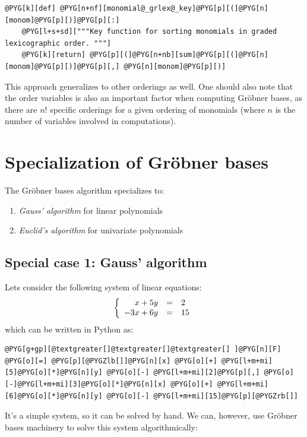 \begin{Verbatim}[commandchars=@\[\]]
@PYG[k][def] @PYG[n+nf][monomial@_grlex@_key]@PYG[p][(]@PYG[n][monom]@PYG[p][)]@PYG[p][:]
    @PYG[l+s+sd]["""Key function for sorting monomials in graded lexicographic order. """]
    @PYG[k][return] @PYG[p][(]@PYG[n+nb][sum]@PYG[p][(]@PYG[n][monom]@PYG[p][)]@PYG[p][,] @PYG[n][monom]@PYG[p][)]
\end{Verbatim}
\noindent
This approach generalizes to other orderings as well. One should also note that the order variables is
also an important factor when computing Gröbner bases, as there are $n!$ specific orderings for a
given ordering of monomials (where $n$ is the number of variables involved in computations).


\section{Specialization of Gröbner bases}

The Gröbner bases algorithm specializes to:
\begin{enumerate}
\item {} 
\emph{Gauss' algorithm} for linear polynomials

\item {} 
\emph{Euclid's algorithm} for univariate polynomials

\end{enumerate}


\subsection{Special case 1: Gauss' algorithm}

Lets consider the following system of linear equations:
\begin{gather}
\begin{split}\left\{
\begin{array}{rcl}
   x + 5 y &=& 2    \\
-3 x + 6 y &=& 15
\end{array}
\right.\end{split}\notag
\end{gather}
which can be written in Python as:

\begin{Verbatim}[commandchars=@\[\]]
@PYG[g+gp][@textgreater[]@textgreater[]@textgreater[] ]@PYG[n][F] @PYG[o][=] @PYG[p][@PYGZlb[]]@PYG[n][x] @PYG[o][+] @PYG[l+m+mi][5]@PYG[o][*]@PYG[n][y] @PYG[o][-] @PYG[l+m+mi][2]@PYG[p][,] @PYG[o][-]@PYG[l+m+mi][3]@PYG[o][*]@PYG[n][x] @PYG[o][+] @PYG[l+m+mi][6]@PYG[o][*]@PYG[n][y] @PYG[o][-] @PYG[l+m+mi][15]@PYG[p][@PYGZrb[]]
\end{Verbatim}
\noindent
It's a simple system, so it can be solved by hand. We can, however, use Gröbner bases
machinery to solve this system algorithmically:

